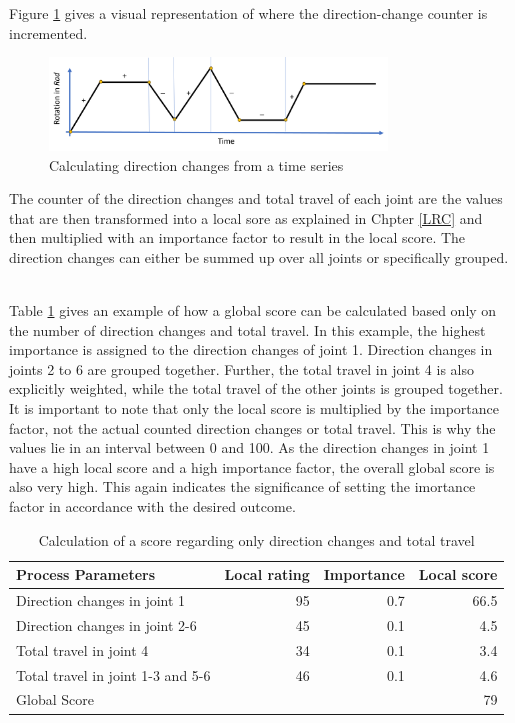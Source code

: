  

Figure \ref{dirchange} gives a visual representation of where the direction-change counter is incremented.

\begin{figure}[H]
	\centerline{\includegraphics[width=0.8\textwidth]{figures/dirchange.png}}
	\caption{Calculating direction changes from a time series}
	\label{dirchange}
\end{figure}

The counter of the direction changes and total travel of each joint are the values that are then transformed into a local sore as explained in Chpter \ref{LRC} and then multiplied with an importance factor to result in the local score. The direction changes can either be summed up over all joints or specifically grouped.  

Table \ref{exampleDirTravel} gives an example of how a global score can be calculated based only on the number of direction changes and total travel. In this example, the highest importance is assigned to the direction changes of joint 1. Direction changes in joints 2 to 6 are grouped together. Further, the total travel in joint 4 is also explicitly weighted, while the total travel of the other joints is grouped together. It is important to note that only the local score is multiplied by the importance factor, not the actual counted direction changes or total travel. This is why the values lie in an interval between 0 and 100. As the direction changes in joint 1 have a high local score and a high importance factor, the overall global score is also very high. This again indicates the significance of setting the imortance factor in accordance with the desired outcome. 


\begin{table}[H]
	\centering
	\begin{tabular}{||l|r|r|r||}
		Process Parameters & Local rating & Importance & Local score\\
		\hline
		\hline
		\hline
		
		Direction changes in joint 1 & 95 & 0.7 & 66.5\\
		Direction changes in joint 2-6 & 45& 0.1&4.5\\
		Total travel in joint 4& 34& 0.1&3.4\\
		Total travel in joint 1-3 and 5-6& 46&0.1&4.6\\
		\hline
		\hline
		\hline
		Global Score& & &79\\
		\hline
		\hline
	\end{tabular}
	
	\caption{Calculation of a score regarding only direction changes and total travel}
	\label{exampleDirTravel}
\end{table}

